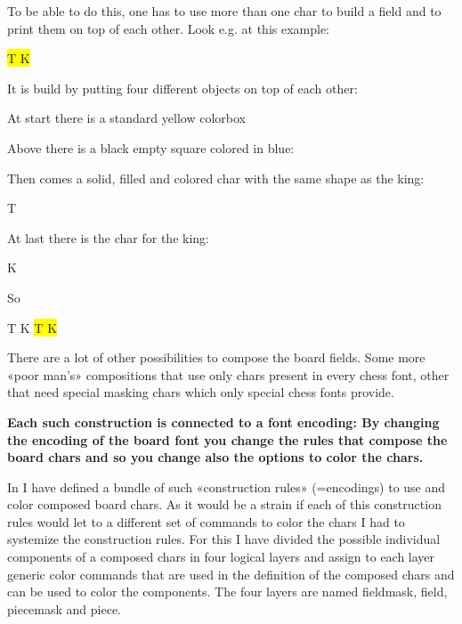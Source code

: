 \documentclass[pagesize,parskip=half-,fontsize=12pt]{scrartcl}
\newcommand\Chess[1][1cm]{\boardfont\fontsize{#1}{#1}\setboardfontsize{#1}\selectfont}
\newcommand\Plus{\raisebox{0.5ex}{\normalfont\fontsize{1.5ex}{1.5ex}\bfseries\,+\,}}
\newcommand\Equal{\raisebox{0.5ex}{\normalfont\fontsize{1.5ex}{1.5ex}\bfseries\,=\,}}
\begin{document}
To be able to do this, one has to use more than one char to build a
field and to print them on top of each other. Look e.g. at this
example:

 \colorbox{yellow}{\Chess
 \makebox[0pt][l]{\color{blue}\BlackEmptySquare}%
 \color{green}T%
 \color{red}K}

It is build by putting four different objects on top of each other:

At start there is a standard yellow colorbox

\colorbox{yellow}{\Chess\phantom{\BlackEmptySquare}}

Above there is a black empty square colored in blue:

{\Chess\color{blue}\BlackEmptySquare}

Then comes a solid, filled and colored char with the same shape as
the king:

{\Chess\color{green}T}

At last there is the char for the king:

{\Chess\color{red}K}

So

{\Chess\colorbox{yellow}{\phantom{\BlackEmptySquare}}\Plus
 {\color{blue}\BlackEmptySquare}\Plus
 {\color{green}T\phantom{\BlackEmptySquare}}\Plus
 {\color{red}K}\Equal
 \colorbox{yellow}{%
 \makebox[0pt][l]{\color{blue}\BlackEmptySquare}%
 \color{green}T%
 \color{red}K}}


There are a lot of other possibilities to compose the board fields.
Some more «poor man's» compositions that use only chars present in
every chess font, other that need special masking chars which only
special chess fonts provide.

{\bfseries Each such construction is connected to a font encoding: By
changing the encoding of the board font you change the rules that
compose the board chars and so you change also the options to color
the chars.}


In \chessfss I have defined a bundle of such «construction rules»
(=encodings) to use and color composed board chars. As it would be a
strain if each of this construction rules would let to a different
set of commands to color the chars I had to systemize the
construction rules. For this I have divided the possible individual
components of a composed chars in four logical layers and assign to
each layer generic color commands that are used in the definition of
the composed chars and can be used to color the components. The four
layers are named fieldmask, field, piecemask and piece.
\end{document}
